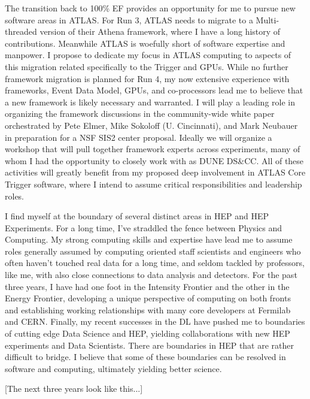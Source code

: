 The transition back to 100\% EF provides an opportunity for me to
pursue new software areas in ATLAS. For Run 3, ATLAS needs to migrate
to a Multi-threaded version of their Athena framework, where I have a
long history of contributions. Meanwhile ATLAS is woefully short of
software expertise and manpower. I propose to dedicate my focus in
ATLAS computing to aspects of this migration related specifically to
the Trigger and GPUs. While no further framework migration is planned
for Run 4, my now extensive experience with frameworks, Event Data
Model, GPUs, and co-processors lead me to believe that a new framework
is likely necessary and warranted.  I will play a leading role in
organizing the framework discussions in the community-wide white paper
orchestrated by Pete Elmer, Mike Sokoloff (U. Cincinnati), and Mark Neubauer in
preparation for a NSF SIS2 center proposal. Ideally we will organize a
workshop that will pull together framework experts across
experiments, many of whom I had the opportunity to closely work with
as DUNE DS\&CC. All of these activities will greatly benefit from my
proposed deep involvement in ATLAS Core Trigger software, where I
intend to assume critical responsibilities and leadership roles.

%



I find myself at the boundary of several distinct areas in HEP and HEP
Experiments. For a long time, I've straddled the fence between Physics
and Computing.  My strong computing skills and expertise have lead me
to assume roles generally assumed by computing oriented staff
scientists and engineers who often haven't touched real data for a
long time, and seldom tackled by professors, like me, with also close
connections to data analysis and detectors.  For the past three years,
I have had one foot in the Intensity Frontier and the other in the
Energy Frontier, developing a unique perspective of computing on both
fronts and establishing working relationships with many core
developers at Fermilab and CERN. Finally, my recent successes in the
DL have pushed me to boundaries of cutting edge Data Science and HEP,
yielding collaborations with new HEP experiments and Data
Scientists. There are boundaries in HEP that are rather difficult to
bridge. I believe that some of these boundaries can be resolved in
software and computing, ultimately yielding better science.

[The next three years look like this...]



